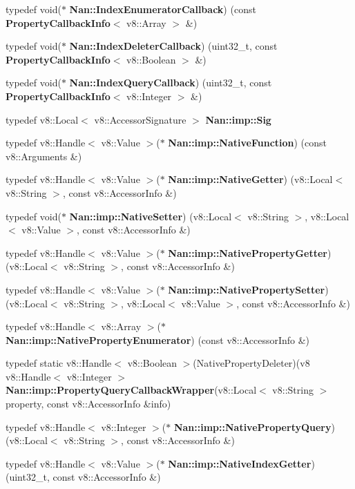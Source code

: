 \begin{DoxyCompactItemize}
\item 
typedef void($\ast$ \textbf{ Nan\+::\+Index\+Enumerator\+Callback}) (const \textbf{ Property\+Callback\+Info}$<$ v8\+::\+Array $>$ \&)
\item 
typedef void($\ast$ \textbf{ Nan\+::\+Index\+Deleter\+Callback}) (uint32\+\_\+t, const \textbf{ Property\+Callback\+Info}$<$ v8\+::\+Boolean $>$ \&)
\item 
typedef void($\ast$ \textbf{ Nan\+::\+Index\+Query\+Callback}) (uint32\+\_\+t, const \textbf{ Property\+Callback\+Info}$<$ v8\+::\+Integer $>$ \&)
\item 
typedef v8\+::\+Local$<$ v8\+::\+Accessor\+Signature $>$ \textbf{ Nan\+::imp\+::\+Sig}
\item 
typedef v8\+::\+Handle$<$ v8\+::\+Value $>$($\ast$ \textbf{ Nan\+::imp\+::\+Native\+Function}) (const v8\+::\+Arguments \&)
\item 
typedef v8\+::\+Handle$<$ v8\+::\+Value $>$($\ast$ \textbf{ Nan\+::imp\+::\+Native\+Getter}) (v8\+::\+Local$<$ v8\+::\+String $>$, const v8\+::\+Accessor\+Info \&)
\item 
typedef void($\ast$ \textbf{ Nan\+::imp\+::\+Native\+Setter}) (v8\+::\+Local$<$ v8\+::\+String $>$, v8\+::\+Local$<$ v8\+::\+Value $>$, const v8\+::\+Accessor\+Info \&)
\item 
typedef v8\+::\+Handle$<$ v8\+::\+Value $>$($\ast$ \textbf{ Nan\+::imp\+::\+Native\+Property\+Getter}) (v8\+::\+Local$<$ v8\+::\+String $>$, const v8\+::\+Accessor\+Info \&)
\item 
typedef v8\+::\+Handle$<$ v8\+::\+Value $>$($\ast$ \textbf{ Nan\+::imp\+::\+Native\+Property\+Setter}) (v8\+::\+Local$<$ v8\+::\+String $>$, v8\+::\+Local$<$ v8\+::\+Value $>$, const v8\+::\+Accessor\+Info \&)
\item 
typedef v8\+::\+Handle$<$ v8\+::\+Array $>$($\ast$ \textbf{ Nan\+::imp\+::\+Native\+Property\+Enumerator}) (const v8\+::\+Accessor\+Info \&)
\item 
typedef static v8\+::\+Handle$<$ v8\+::\+Boolean $>$(Native\+Property\+Deleter)(v8 v8\+::\+Handle$<$ v8\+::\+Integer $>$ \textbf{ Nan\+::imp\+::\+Property\+Query\+Callback\+Wrapper}(v8\+::\+Local$<$ v8\+::\+String $>$ property, const v8\+::\+Accessor\+Info \&info)
\item 
typedef v8\+::\+Handle$<$ v8\+::\+Integer $>$($\ast$ \textbf{ Nan\+::imp\+::\+Native\+Property\+Query}) (v8\+::\+Local$<$ v8\+::\+String $>$, const v8\+::\+Accessor\+Info \&)
\item 
typedef v8\+::\+Handle$<$ v8\+::\+Value $>$($\ast$ \textbf{ Nan\+::imp\+::\+Native\+Index\+Getter}) (uint32\+\_\+t, const v8\+::\+Accessor\+Info \&)

\end{DoxyCompactItemize}
